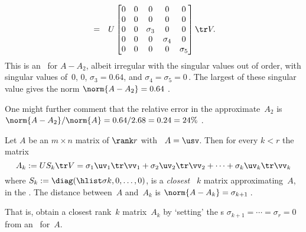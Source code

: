 \begin{example}
\begin{solution}
\begin{itemize}
\begin{eqnarray*}
\\&=&U\begin{bmatrix} 0&0&0&0&0
\\0&0&0&0&0
\\0&0&\sigma_3&0&0
\\0&0&0&\sigma_4&0
\\0&0&0&0&\sigma_5 \end{bmatrix}\tr V.
\end{eqnarray*}
This is an \svd\ for \(A-A_2\), albeit irregular with the singular values out of order, with singular values of~\(0\), \(0\), \(\sigma_3=0.64\), and \(\sigma_4=\sigma_5=0\)\,.
The largest of these singular value gives the norm \(\norm{A-A_2}=0.64\) \twodp.

One might further comment that the relative error in the approximate~\(A_2\) is \(\norm{A-A_2}/\norm{A}=0.64/2.68=0.24=24\%\) \twodp.
\end{itemize}
\end{solution}
\end{example}








\begin{theorem} \label{thm:am}
Let \(A\) be an \(m\times n\) matrix of \(\rank r\) with \svd\ \(A=\usv\).  
Then for every \(k< r\) the matrix
\begin{equation}
A_k:=US_k\tr V =\sigma_1\uv_1\tr\vv_1 +\sigma_2\uv_2\tr\vv_2+\cdots +\sigma_k\uv_k\tr\vv_k
\label{eq:rankkA}
\end{equation}
where \(S_k:=\diag(\hlist\sigma k,0,\ldots,0)\), is a \emph{closest} ~\(k\) matrix approximating~\(A\), in the .
The distance between~\(A\) and~\(A_k\) is \(\norm{A-A_k}=\sigma_{k+1}\)\,.
\end{theorem}

That is, obtain a closest rank~\(k\) matrix~\(A_k\) by `setting' the s \(\sigma_{k+1}=\cdots=\sigma_r=0\) from an \svd\ for~\(A\).

